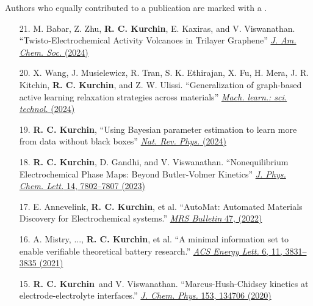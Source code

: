 Authors who equally contributed to a publication are marked with a \textdagger.

\newcommand{\myname}{\textbf{R. C. Kurchin}}

\begin{enumerate}
        \item[21.] M. Babar, Z. Zhu, \myname, E. Kaxiras, and V. Viswanathan. ``Twisto-Electrochemical Activity Volcanoes in Trilayer Graphene'' \href{https://pubs.acs.org/doi/full/10.1021/jacs.4c03464}{\textit{J. Am. Chem. Soc.} (2024)}

        \item[20.] X. Wang, J. Musielewicz, R. Tran, S. K. Ethirajan, X. Fu, H. Mera, J. R. Kitchin, \myname, and Z. W. Ulissi. ``Generalization of graph-based active learning relaxation strategies across materials'' \href{https://iopscience.iop.org/article/10.1088/2632-2153/ad37f0}{\textit{Mach. learn.: sci. technol.} (2024)}

        \item[19.] \myname, ``Using Bayesian parameter estimation to learn more from data without black boxes'' \href{https://www.nature.com/articles/s42254-024-00698-0}{\textit{Nat. Rev. Phys.} (2024)}

        \item[18.] \myname, D. Gandhi, and V. Viswanathan. ``Nonequilibrium Electrochemical Phase Maps: Beyond Butler-Volmer Kinetics'' \href{https://pubs.acs.org/doi/10.1021/acs.jpclett.3c01992}{\textit{J. Phys. Chem. Lett.} 14, 7802--7807 (2023)}

        \item[17.] E. Annevelink\ec, \myname\ec, et al. ``AutoMat: Automated Materials Discovery for Electrochemical systems.'' \href{https://doi.org/10.1557/s43577-022-00424-0}{\textit{MRS Bulletin} 47, (2022)}

        \item[16.] A. Mistry, ..., \myname, et al. ``A minimal information set to enable verifiable theoretical battery research.'' \href{https://pubs.acs.org/doi/10.1021/acsenergylett.1c01710}{\textit{ACS Energy Lett.} 6, 11, 3831--3835 (2021)}

        \item[15.] \myname~and V. Viswanathan. ``Marcus-Hush-Chidsey kinetics at electrode-electrolyte interfaces.'' \href{https://aip.scitation.org/doi/10.1063/5.0023611}{\textit{J. Chem. Phys.} 153, 134706 (2020)}


\end{enumerate}
